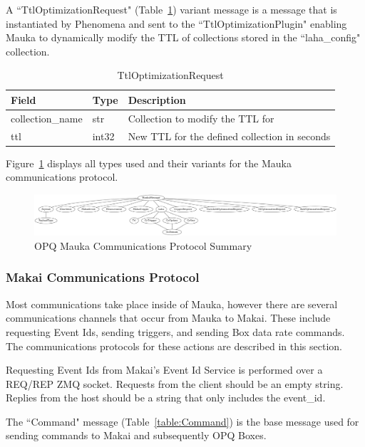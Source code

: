 A ``TtlOptimizationRequest" (Table~\ref{table:TtlOptimizationRequest}) variant message is a message that is instantiated by Phenomena and sent to the ``TtlOptimizationPlugin" enabling Mauka to dynamically modify the TTL of collections stored in the ``laha\_config" collection.

\begin{table}[H]
	\centering
	\caption{TtlOptimizationRequest}
	\begin{tabularx}{\textwidth}{llX}
		\toprule
		\textbf{Field} & \textbf{Type} & \textbf{Description} \\
		\midrule
		collection\_name & str & Collection to modify the TTL for \\
		ttl & int32 & New TTL for the defined collection in seconds \\
		\bottomrule
	\end{tabularx}
	\label{table:TtlOptimizationRequest}
\end{table}

Figure~\ref{fig:mauka_messages} displays all types used and their variants for the Mauka communications protocol.

\begin{figure}
	\centering
	\includegraphics[width=\linewidth]{figures/mauka_messages.png}
	\caption{OPQ Mauka Communications Protocol Summary}
	\label{fig:mauka_messages}
\end{figure}

\subsubsection{Makai Communications Protocol}

Most communications take place inside of Mauka, however there are several communications channels that occur from Mauka to Makai. These include requesting Event Ids, sending triggers, and sending Box data rate commands. The communications protocols for these actions are described in this section.

Requesting Event Ids from Makai's Event Id Service is performed over a REQ/REP ZMQ socket. Requests from the client should be an empty string. Replies from the host should be a string that only includes the event\_id.

The ``Command" message (Table~\ref{table:Command}) is the base message used for sending commands to Makai and subsequently OPQ Boxes.

